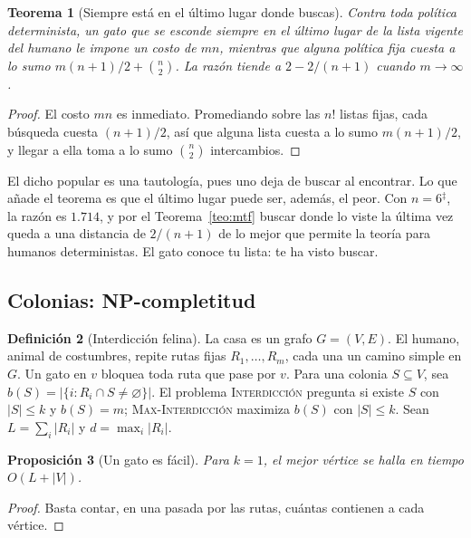 \documentclass[11pt,a4paper]{article}
\theoremstyle{plain}
\newtheorem{teorema}{Teorema}[section]
\newtheorem{proposicion}[teorema]{Proposición}
\theoremstyle{definition}
\newtheorem{definicion}[teorema]{Definición}
\theoremstyle{remark}
\numberwithin{equation}{section}
\newcommand{\calib}{{\ensuremath{^{\ddagger}}}}
\newcommand{\prob}[1]{\textnormal{\textsc{#1}}}
\begin{document}
\begin{teorema}[Siempre está en el último lugar donde buscas]\label{teo:ultimo}
Contra toda política determinista, un gato que se esconde siempre en el último lugar de la lista vigente del humano le impone un costo de $mn$, mientras que alguna política fija cuesta a lo sumo $m(n+1)/2+\binom n2$. La razón tiende a $2-2/(n+1)$ cuando $m\to\infty$.
\end{teorema}

\begin{proof}
El costo $mn$ es inmediato. Promediando sobre las $n!$ listas fijas, cada búsqueda cuesta $(n+1)/2$, así que alguna lista cuesta a lo sumo $m(n+1)/2$, y llegar a ella toma a lo sumo $\binom n2$ intercambios.
\end{proof}

El dicho popular es una tautología, pues uno deja de buscar al encontrar. Lo que añade el teorema es que el último lugar puede ser, además, el peor. Con $n=6$\calib, la razón es $1.714$, y por el Teorema~\ref{teo:mtf} buscar donde lo viste la última vez queda a una distancia de $2/(n+1)$ de lo mejor que permite la teoría para humanos deterministas. El gato conoce tu lista: te ha visto buscar.

\subsection{Colonias: NP-completitud}

\begin{definicion}[Interdicción felina]
La casa es un grafo $G=(V,E)$. El humano, animal de costumbres, repite rutas fijas $R_1,\dots,R_m$, cada una un camino simple en $G$. Un gato en $v$ bloquea toda ruta que pase por $v$. Para una colonia $S\subseteq V$, sea $b(S)=|\{i:R_i\cap S\ne\varnothing\}|$. El problema \prob{Interdicción} pregunta si existe $S$ con $|S|\le k$ y $b(S)=m$; \prob{Max-Interdicción} maximiza $b(S)$ con $|S|\le k$. Sean $L=\sum_i|R_i|$ y $d=\max_i|R_i|$.
\end{definicion}

\begin{proposicion}[Un gato es fácil]\label{prop:ungato}
Para $k=1$, el mejor vértice se halla en tiempo $O(L+|V|)$.
\end{proposicion}

\begin{proof}
Basta contar, en una pasada por las rutas, cuántas contienen a cada vértice.
\end{proof}
\end{document}
